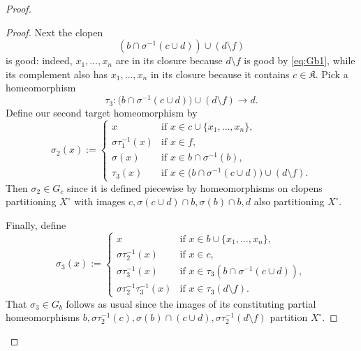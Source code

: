 \documentclass[12pt,a4paper,reqno]{amsart}
\numberwithin{equation}{section}
\theoremstyle{plain}
\theoremstyle{definition}
\newcommand*{\proofclaimname}{Proof}
\newenvironment{proofclaim}[1][\proofclaimname]{\begin{proof}[#1]\renewcommand*{\qedsymbol}{\(\diamond\)}}{\end{proof}}
\begin{document}
\begin{proof}
\begin{proofclaim}
Next the clopen
\[
(b\cap \sigma^{-1}(c\cup d))\cup (d\setminus f)
\]
is good: indeed, $x_1,\dots,x_n$ are in its closure
because $d\setminus f$ is good by \eqref{eq:Gb1}, while its complement also has $x_1,\dots,x_n$ in its closure
because it contains $c\in\mathfrak{K}$.
Pick a homeomorphism
\begin{equation*}
\tau_3\colon \bigl(b\cap \sigma^{-1}(c\cup d)\bigr)\cup (d\setminus f)\rightarrow d.
\end{equation*}
 Define our second target homeomorphism
 by
 \begin{equation}
 \label{eq:Gb11}
 \sigma_2(x):= 
 \begin{cases}
 x & \text{if } x\in c \cup \{x_1,\dots,x_n\},\\
 \sigma\tau_1^{-1}(x) & \text{if } x\in f,\\
 \sigma(x) & \text{if } x\in b\cap \sigma^{-1}(b),\\
 \tau_3(x) & \text{if } x\in \bigl(b\cap \sigma^{-1}(c\cup d)\bigr)\cup (d\setminus f).
 \end{cases}
 \end{equation}
 Then $\sigma_2\in G_c$ since it is defined piecewise by homeomorphisms on clopens partitioning $X^\circ$ with
 images $c, \sigma(c\cup d)\cap b, \sigma(b)\cap b, d$ also partitioning $X^\circ$.
 
 Finally, define
 \begin{equation}
 \label{eq:Gb13}
 \sigma_3(x) := 
 \begin{cases}
 x & \text{if } x\in b \cup \{x_1,\dots,x_n\},\\
 \sigma\tau_2^{-1}(x) & \text{if } x\in c,\\
 \sigma\tau_3^{-1}(x) & \text{if } x\in \tau_3(b\cap \sigma^{-1}(c\cup d)),\\
 \sigma\tau_2^{-1}\tau_3^{-1}(x) & \text{if } x\in \tau_3(d\setminus f).
 \end{cases}
 \end{equation}
 That $\sigma_3\in G_b$ follows as usual since the images of its constituting partial homeomorphisms
 $b, \sigma\tau_2^{-1}(c), \sigma(b)\cap (c\cup d), \sigma\tau_2^{-1}(d\setminus f)$ partition $X^\circ$.
 

\end{proofclaim}
\end{proof}
\end{document}
